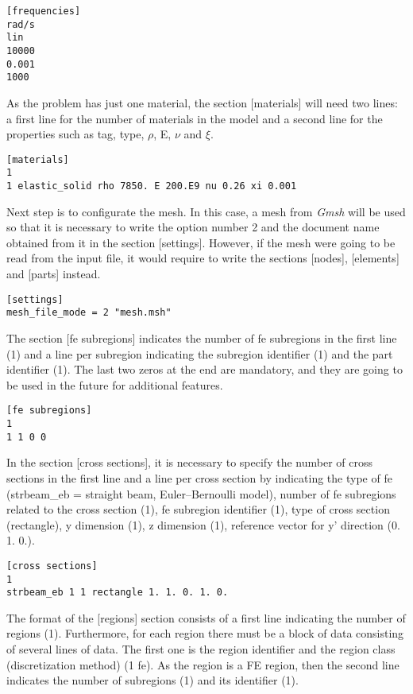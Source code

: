 \documentclass[a4]{article}
\begin{document}
\begin{Verbatim}
[frequencies]
rad/s
lin
10000
0.001
1000
\end{Verbatim}

As the problem has just one material, the section [materials] will need two lines: a first line for the number of materials in the model and a second line for the properties such as tag, type, $\rho$, E, $\nu$ and $\xi$.

\begin{Verbatim}
[materials]
1
1 elastic_solid rho 7850. E 200.E9 nu 0.26 xi 0.001
\end{Verbatim}

Next step is to configurate the mesh. In this case, a mesh from \textit{Gmsh} will be used so that it is necessary to write the option number 2 and the document name obtained from it in the section [settings]. However, if the mesh were going to be read from the input file, it would require to write the sections [nodes], [elements] and [parts] instead.

\begin{Verbatim}	
[settings]
mesh_file_mode = 2 "mesh.msh"
\end{Verbatim}

The section [fe subregions] indicates the number of fe subregions in the first line (1) and a line per subregion indicating the subregion identifier (1) and the part identifier (1). The last two zeros at the end are mandatory, and they are going to be used in the future for additional features.

\begin{Verbatim}
[fe subregions]
1
1 1 0 0
\end{Verbatim}

In the section [cross sections], it is necessary to specify the number of cross sections in the first line and a line per cross section by indicating the type of fe (strbeam\_eb = straight beam, Euler–Bernoulli model), number of fe subregions related to the cross section (1), fe subregion identifier (1), type of cross section (rectangle), y dimension (1), z dimension (1), reference vector for y' direction (0. 1. 0.).

\begin{Verbatim}
[cross sections]
1
strbeam_eb 1 1 rectangle 1. 1. 0. 1. 0.
\end{Verbatim}

The format of the [regions] section consists of a first line indicating the number of regions (1). Furthermore, for each region there must be a block of data consisting of several lines of data. The first one is the region identifier and the region class (discretization method) (1 fe). As the region is a FE region, then the second line indicates the number of subregions (1) and its identifier (1).
\end{document}
